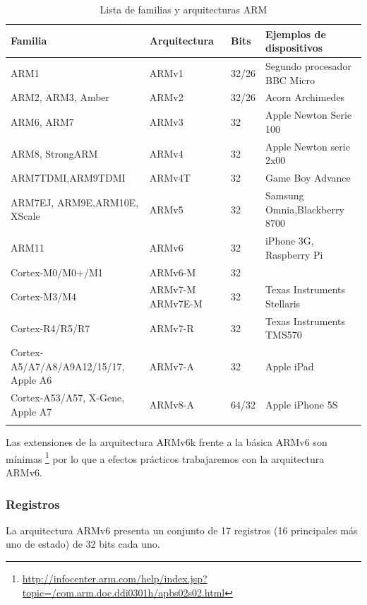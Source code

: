 \begin{longtable}{| p{4.2cm} | p{2.5cm} | p{1cm} | p{6cm} |}
\hline
{\bf Familia} & {\bf Arquitectura} & {\bf Bits} & {\bf Ejemplos de dispositivos} \\ \hline
ARM1      & ARMv1       & 32/26 & Segundo procesador BBC Micro \\ \hline
ARM2, ARM3, Amber & ARMv2      & 32/26 & Acorn Archimedes \\ \hline
ARM6, ARM7 & ARMv3      & 32 & Apple Newton Serie 100 \\ \hline
ARM8, StrongARM & ARMv4       & 32 & Apple Newton serie 2x00 \\ \hline
ARM7TDMI,\newline ARM9TDMI & ARMv4T & 32 & Game Boy Advance \\ \hline
ARM7EJ, ARM9E,\newline ARM10E, XScale & ARMv5 & 32 & Samsung Omnia,\newline Blackberry 8700 \\ \hline
ARM11     & ARMv6 & 32 & iPhone 3G, Raspberry Pi \\ \hline
Cortex-M0/M0+/M1 & ARMv6-M & 32 & \\ \hline
Cortex-M3/M4 & ARMv7-M ARMv7E-M & 32 & Texas Instruments Stellaris \\ \hline
Cortex-R4/R5/R7 & ARMv7-R & 32 & Texas Instruments TMS570 \\ \hline
Cortex-A5/A7/A8/A9\newline A12/15/17, Apple A6 & ARMv7-A & 32 & Apple iPad \\ \hline
Cortex-A53/A57, X-Gene, Apple A7 & ARMv8-A & 64/32 & Apple iPhone 5S\\ \hline
\caption{Lista de familias y arquitecturas ARM}
\label{list_fam}
\end{longtable}

Las extensiones de la arquitectura ARMv6k frente a la básica ARMv6 son mínimas
\footnote{\url{http://infocenter.arm.com/help/index.jsp?topic=/com.arm.doc.ddi0301h/apbs02s02.html}}
por lo que a efectos prácticos trabajaremos con la arquitectura ARMv6.

\subsubsection{Registros}
La arquitectura ARMv6 presenta un conjunto de 17 registros (16 principales
más uno de estado) de 32 bits cada uno.
\newline


